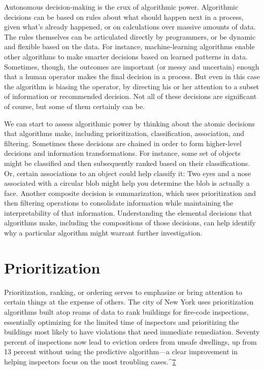 Autonomous decision-making is the crux of algorithmic power. Algorithmic decisions can be based on rules about what should happen next in a process, given what's already happened, or on calculations over massive amounts of data. The rules themselves can be articulated directly by programmers, or be dynamic and flexible based on the data. For instance, machine-learning algorithms enable other algorithms to make smarter decisions based on learned patterns in data. Sometimes, though, the outcomes are important (or messy and uncertain) enough that a human operator makes the final decision in a process. But even in this case the algorithm is biasing the operator, by directing his or her attention to a subset of information or recommended decision. Not all of these decisions are significant of course, but some of them certainly can be. 

We can start to assess algorithmic power by thinking about the atomic decisions that algorithms make, including prioritization, classification, association, and filtering. Sometimes these decisions are chained in order to form higher-level decisions and information transformations. For instance, some set of objects might be classified and then subsequently ranked based on their classifications. Or, certain associations to an object could help classify it: Two eyes and a nose associated with a circular blob might help you determine the blob is actually a face. Another composite decision is summarization, which uses prioritization and then filtering operations to consolidate information while maintaining the interpretability of that information. Understanding the elemental decisions that algorithms make, including the compositions of those decisions, can help identify why a particular algorithm might warrant further investigation. 

\section{Prioritization }
Prioritization, ranking, or ordering serves to emphasize or bring attention to certain things at the expense of others. The city of New York uses prioritization algorithms built atop reams of data to rank buildings for fire-code inspections, essentially optimizing for the limited time of inspectors and prioritizing the buildings most likely to have violations that need immediate remediation. Seventy percent of inspections now lead to eviction orders from unsafe dwellings, up from 13 percent without using the predictive algorithm—a clear improvement in helping inspectors focus on the most troubling cases.^{\href{#endnotes}{7}}

